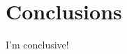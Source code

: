 \documentclass[preprint]{sig-alternate-10pt}
\begin{document}
\section{Conclusions}
I'm conclusive!



%

%

%

%
%

%

%

%

%

%

%

%
%

%

%








\end{document}
